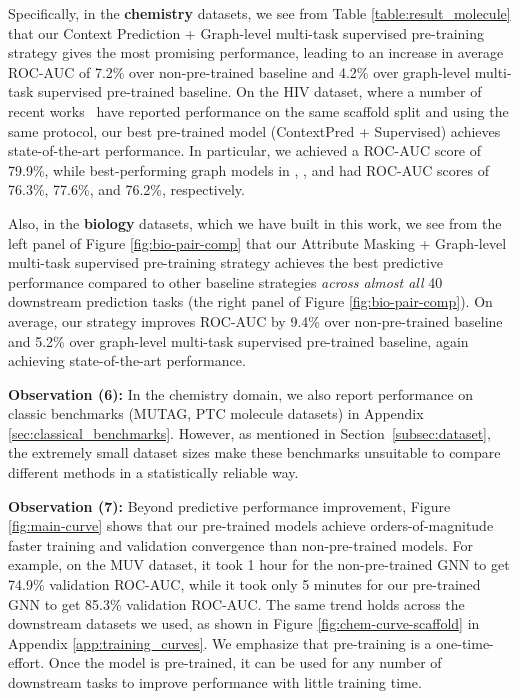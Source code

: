 \documentclass{article} \usepackage{iclr2020_conference,times}
\numberwithin{equation}{section}
\theoremstyle{plain}
\theoremstyle{definition}
\theoremstyle{remark}
\begin{document}
Specifically, in the {\bf chemistry} datasets, we see from Table \ref{table:result_molecule} that our Context Prediction + Graph-level multi-task supervised pre-training strategy gives the most promising performance, leading to an increase in average ROC-AUC of 7.2\% over non-pre-trained baseline and 4.2\% over graph-level multi-task supervised pre-trained baseline. On the HIV dataset, where a number of recent works~\citep{wu2018moleculenet,li2017learning,ishiguro2019graph} have reported performance on the same scaffold split and using the same protocol, our best pre-trained model (ContextPred + Supervised) achieves state-of-the-art performance. In particular, we achieved a ROC-AUC score of 79.9\%, while best-performing graph models in \citet{wu2018moleculenet}, \citet{li2017learning}, and \citet{ishiguro2019graph} had ROC-AUC scores of 76.3\%, 77.6\%, and 76.2\%, respectively. 

Also, in the {\bf biology} datasets, which we have built in this work, we see from the left panel of Figure \ref{fig:bio-pair-comp} that our Attribute Masking + Graph-level multi-task supervised pre-training strategy achieves the best predictive performance compared to other baseline strategies \emph{across almost all} 40 downstream prediction tasks (the right panel of Figure \ref{fig:bio-pair-comp}). On average, our strategy improves ROC-AUC by 9.4\% over non-pre-trained baseline and 5.2\% over graph-level multi-task supervised pre-trained baseline, again achieving state-of-the-art performance.

{\bf Observation (6):} In the chemistry domain, we also report performance on classic benchmarks (MUTAG, PTC molecule datasets) in Appendix \ref{sec:classical_benchmarks}. However, as mentioned in Section~\ref{subsec:dataset}, the extremely small dataset sizes make these benchmarks unsuitable to compare different methods in a statistically reliable way.

{\bf Observation (7):} Beyond predictive performance improvement, Figure \ref{fig:main-curve} shows that our pre-trained models achieve orders-of-magnitude faster training and validation convergence than non-pre-trained models. For example, on the MUV dataset, it took 1 hour for the non-pre-trained GNN to get 74.9\% validation ROC-AUC, while it took only 5 minutes for our pre-trained GNN to get 85.3\% validation ROC-AUC. The same trend holds across the downstream datasets we used, as shown in Figure \ref{fig:chem-curve-scaffold} in Appendix \ref{app:training_curves}. We emphasize that pre-training is a one-time-effort. Once the model is pre-trained, it can be used for any number of downstream tasks to improve performance with little training time.
\end{document}
